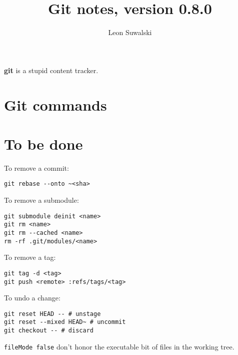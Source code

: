 \documentclass{charun}
\title{Git notes, version 0.8.0}
\author{Leon Suwalski}
\begin{document}
\begin{multicols*}{2}
\maketitle
\raggedright

\textbf{git} is a stupid content tracker.

\section{Git commands}




























\section{To be done}
To remove a commit:
\begin{verbatim}
git rebase --onto ~<sha>
\end{verbatim}

To remove a submodule:
\begin{verbatim}
git submodule deinit <name>
git rm <name>
git rm --cached <name>
rm -rf .git/modules/<name>
\end{verbatim}

To remove a tag:
\begin{verbatim}
git tag -d <tag>
git push <remote> :refs/tags/<tag>
\end{verbatim}

To undo a change:
\begin{verbatim}
git reset HEAD -- # unstage
git reset --mixed HEAD~ # uncommit
git checkout -- # discard
\end{verbatim}

\texttt{fileMode false} don't honor the executable bit of files in the working tree.


\end{multicols*}
\end{document}
